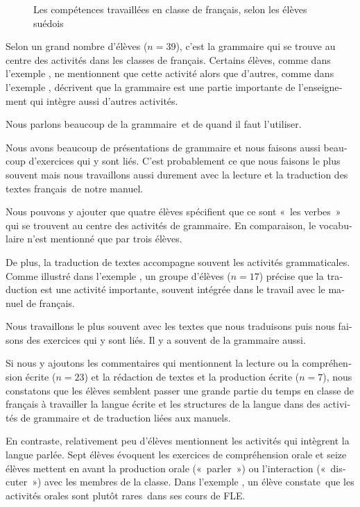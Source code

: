 \documentclass[french, output=paper]{langscibook}
\begin{document}
\begin{otherlanguage}{french}
\begin{figure}
\caption{\label{fig:granfeldt:9}Les compétences travaillées en classe de français, selon les élèves suédois}
\end{figure}

Selon un grand nombre d’élèves ($n=39$), c’est la grammaire qui se trouve au centre des activités dans les classes de français. Certains élèves, comme dans l’exemple , ne mentionnent que cette activité alors que d’autres, comme dans l’exemple , décrivent que la grammaire est une partie importante de l’enseignement qui intègre aussi d’autres activités.

\ea%
    \label{ex:granfeldt:7}
    Nous parlons beaucoup de la grammaire~et de quand il faut l’utiliser.
\z

\ea%
    \label{ex:granfeldt:8}
    Nous avons beaucoup de présentations de grammaire et nous faisons aussi beaucoup d’exercices qui y sont liés. C’est probablement ce que nous faisons le plus souvent mais nous travaillons aussi durement avec la lecture et la traduction des textes français~de notre manuel. 
\z

Nous pouvons y ajouter que quatre élèves spécifient que ce sont «~les verbes~» qui se trouvent au centre des activités de grammaire. En comparaison, le vocabulaire n’est mentionné que par trois élèves. 

De plus, la traduction de textes accompagne souvent les activités grammaticales. Comme illustré dans l’exemple , un groupe d’élèves ($n=17$) précise que la traduction est une activité importante, souvent intégrée dans le travail avec le manuel de français.

\ea%
    \label{ex:granfeldt:9}
    Nous travaillons le plus souvent avec les textes que nous traduisons puis nous faisons des exercices qui y sont liés. Il y a souvent de la grammaire aussi. 
\z

Si nous y ajoutons les commentaires qui mentionnent la lecture ou la compréhension écrite ($n=23$) et la rédaction de textes et la production écrite ($n=7$), nous constatons que les élèves semblent passer une grande partie du temps en classe de français à travailler la langue écrite et les structures de la langue dans des activités de grammaire et de traduction liées aux manuels.

\begin{sloppypar}
En contraste, relativement peu d’élèves mentionnent les activités qui intègrent la langue parlée. Sept élèves évoquent les exercices de compréhension orale et seize élèves mettent en avant la production orale («~parler~») ou l’interaction («~discuter~») avec les membres de la classe. Dans l’exemple , un élève constate~que les activités orales sont plutôt rares~dans ses cours de FLE.
\end{sloppypar}


\end{otherlanguage}
\end{document}
